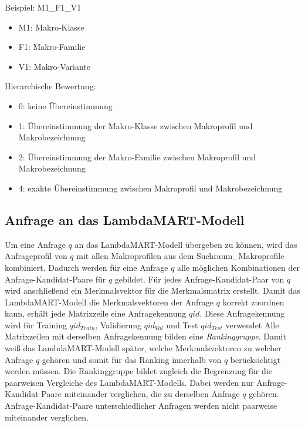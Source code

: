 Beispiel: M1\_F1\_V1
\begin{itemize}
    \item M1: Makro-Klasse
    \item F1: Makro-Familie
    \item V1: Makro-Variante
\end{itemize}

Hierarchische Bewertung:

\begin{itemize}
    \item 0: keine Übereinstimmung
    \item 1: Übereinstimmung der Makro-Klasse zwischen Makroprofil und Makrobezeichnung
    \item 2: Übereinstimmung der Makro-Familie zwischen Makroprofil und Makrobezeichnung
    \item 4: exakte Übereinstimmung zwischen Makroprofil und Makrobezeichnung
\end{itemize}
 


\subsection{Anfrage an das LambdaMART-Modell}
\label{sec:anfrage_an_das_lambdamart_modell}

Um eine Anfrage \(q\) an das LambdaMART-Modell übergeben zu können, wird das Anfrageprofil von \(q\) mit allen Makroprofilen aus dem Suchraum\_Makroprofile kombiniert. 
Dadurch werden für eine Anfrage \(q\) alle möglichen Kombinationen der Anfrage-Kandidat-Paare für \(q\) gebildet. 
Für jedes Anfrage-Kandidat-Paar von \(q\) wird anschließend ein Merkmalsvektor für die Merkmalsmatrix erstellt.
Damit das LambdaMART-Modell die Merkmalsvektoren der Anfrage \(q\) korrekt zuordnen kann, erhält jede Matrixzeile eine Anfragekennung \(qid\).
Diese Anfragekennung wird für Training \(qid_{Train}\), Validierung \(qid_{Val}\) und Test \(qid_{Test}\) verwendet 
Alle Matrixzeilen mit derselben Anfragekennung bilden eine \textit{Rankinggruppe}. 
Damit weiß das LambdaMART-Modell später, welche Merkmalsvektoren zu welcher Anfrage \(q\) gehören und somit für das Ranking innerhalb von \(q\) berücksichtigt werden müssen.
Die Rankinggruppe bildet zugleich die Begrenzung für die paarweisen Vergleiche des LambdaMART-Modells. 
Dabei werden nur Anfrage-Kandidat-Paare miteinander verglichen, die zu derselben Anfrage \(q\) gehören. Anfrage-Kandidat-Paare unterschiedlicher Anfragen werden nicht paarweise miteinander verglichen.

